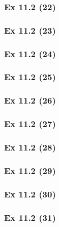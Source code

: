 \subsubsection{Ex 11.2 (22)}\label{sec:Ex_11.2.22}

\subsubsection{Ex 11.2 (23)}\label{sec:Ex_11.2.23}

\subsubsection{Ex 11.2 (24)}\label{sec:Ex_11.2.24}

\subsubsection{Ex 11.2 (25)}\label{sec:Ex_11.2.25}

\subsubsection{Ex 11.2 (26)}\label{sec:Ex_11.2.26}

\subsubsection{Ex 11.2 (27)}\label{sec:Ex_11.2.27}

\subsubsection{Ex 11.2 (28)}\label{sec:Ex_11.2.28}

\subsubsection{Ex 11.2 (29)}\label{sec:Ex_11.2.29}

\subsubsection{Ex 11.2 (30)}\label{sec:Ex_11.2.30}

\newpage		%

\subsubsection{Ex 11.2 (31)}\label{sec:Ex_11.2.31}

